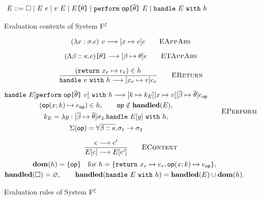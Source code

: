 \begin{figure}[p]
    \small
    \begin{align*}
        E &::= \square
             \mid E~e
             \mid v~E
             \mid E\texttt{[} \theta \texttt{]}
             \mid \texttt{perform}~\mathsf{op}
                  \texttt{[} \overline{\theta} \texttt{]}~E
             \mid \texttt{handle}~E~\texttt{with}~h
    \end{align*}
    \caption{Evaluation contexts of System F$^{\xi}$}
    \label{systemf:evaluation-contexts}
\end{figure}

\begin{figure}[p]
    \small
    \noindent{}

    \medskip
    \begin{gather*}
        (\lambda x:\sigma.e)~v
        \longrightarrow [x\mapsto v]e
        \qquad\textsc{EAppAbs}
        \\[6pt]
        (\Lambda\beta::\kappa.e)\texttt{[} \theta \texttt{]}
        \longrightarrow [\beta\mapsto\theta]e
        \qquad\textsc{ETAppAbs}
        \\[6pt]
        \frac{(\texttt{return}~x_r\mapsto e_r)\in h}
             {\texttt{handle}~v~\texttt{with}~h
              \longrightarrow [x_r\mapsto v]e_r}
        \qquad\textsc{EReturn}
        \\[6pt]
        \begin{gathered}
        \texttt{handle}~
          E[\texttt{perform}~\mathsf{op}
             \texttt{[} \overline{\theta} \texttt{]}~v]~
          \texttt{with}~h
        \longrightarrow
          [k\mapsto k_E][x\mapsto v]
          [\overline{\beta}\mapsto\overline{\theta}]
          e_{\mathsf{op}}\\
        (\mathsf{op}(x;k)\mapsto e_{\mathsf{op}})\in h,
        \qquad\mathsf{op}\notin\mathbf{handled}(E),\\
        k_E=\lambda y:
          [\overline{\beta}\mapsto\overline{\theta}]\sigma_2.
          \texttt{handle}~E[y]~\texttt{with}~h,\\
        \Sigma(\mathsf{op})=
          \forall\overline{\beta::\kappa}.\sigma_1\to\sigma_2
        \end{gathered}
        \qquad\textsc{EPerform}
        \\[6pt]
        \frac{e\longrightarrow e'}{E[e]\longrightarrow E[e']}
        \qquad\textsc{EContext}
    \end{gather*}
    \[\begin{gathered}
        \mathbf{dom}(h)=\{\mathsf{op}\}\quad
        \text{for }h=\{\texttt{return}~x_r\mapsto e_r,
          \mathsf{op}(x;k)\mapsto e_{\mathsf{op}}\},
        \\
        \mathbf{handled}(\square)=\varnothing,\qquad
        \mathbf{handled}(\texttt{handle}~E~\texttt{with}~h)
          =\mathbf{handled}(E)\cup\mathbf{dom}(h).
    \end{gathered}\]

    \caption{Evaluation rules of System F$^{\xi}$}
    \label{systemf:evaluation-rules}
\end{figure}
